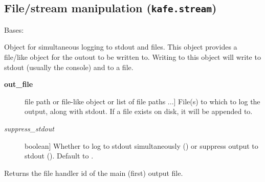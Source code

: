 \documentclass[a4paper,10pt,english]{sphinxmanual}
\begin{document}
\subsection{File/stream manipulation (\texttt{kafe.stream})}
\label{module_doc:file-stream-manipulation-kafe-stream}\label{module_doc:module-kafe.stream}\label{module_doc:module-stream}

\begin{fulllineitems}
\label{module_doc:kafe.stream.StreamDup}
Bases: 

Object for simultaneous logging to stdout and files.
This object provides a file/like object for the outout to be written to.
Writing to this object will write to stdout (usually the console) and to
a file.
\begin{description}
\item[{\textbf{out\_file}}] \leavevmode{[}file path or file-like object or list of file paths ...{]}
File(s) to which to log the output, along with stdout. If a file exists
on disk, it will be appended to.

\item[{\emph{suppress\_stdout}}] \leavevmode{[}boolean{]}
Whether to log to stdout simultaneously () or suppress output
to stdout (). Default to .

\end{description}

\begin{fulllineitems}
\label{module_doc:kafe.stream.StreamDup.fileno}
Returns the file handler id of the main (first) output file.

\end{fulllineitems}


\begin{fulllineitems}
\label{module_doc:kafe.stream.StreamDup.flush}
\end{fulllineitems}


\begin{fulllineitems}
\label{module_doc:kafe.stream.StreamDup.write}
\end{fulllineitems}


\end{fulllineitems}
\end{document}
